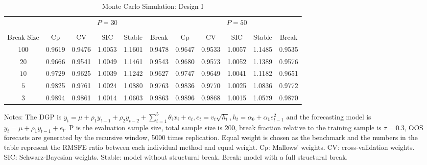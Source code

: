 \newpage
\begin{table}
    \caption{Monte Carlo Simulation: Design I} \label{ntb:1}
    \centering
    \begin{adjustbox}{width=\textwidth,totalheight=\textheight,keepaspectratio}
    \begin{threeparttable}
    \begin{tabular}{ccccccccccc}
    \toprule
     & \multicolumn{5}{c}{$P = 30$} & \multicolumn{5}{c}{$P = 50$} \\
    \cmidrule(r){2-6}
    \cmidrule(r){7-11} \\
      Break Size   & Cp     &   CV   & SIC    & Stable & Break  & Cp     & CV     & SIC    & Stable & Break \\
             $100$ & 0.9619 & 0.9476 & 1.0053 & 1.1601 & 0.9478 & 0.9647 & 0.9533 & 1.0057 & 1.1485 & 0.9535 \\
             $20$  & 0.9666 & 0.9541 & 1.0049 & 1.1461 & 0.9543 & 0.9680 & 0.9573 & 1.0052 & 1.1389 & 0.9576 \\
             $10$  & 0.9729 & 0.9625 & 1.0039 & 1.1242 & 0.9627 & 0.9747 & 0.9649 & 1.0041 & 1.1182 & 0.9651 \\
             $5$   & 0.9825 & 0.9761 & 1.0024 & 1.0880 & 0.9763 & 0.9836 & 0.9770 & 1.0025 & 1.0836 & 0.9772 \\
             $3$   & 0.9894 & 0.9861 & 1.0014 & 1.0603 & 0.9863 & 0.9896 & 0.9868 & 1.0015 & 1.0579 & 0.9870 \\
    \bottomrule
    \end{tabular}
    \begin{tablenotes} \footnotesize
    Notes: The DGP is $y_{t} = \mu + \rho_{1}y_{t-1} + \rho_{2}y_{t-2} + \sum_{i=1}^{5}\theta_{i}x_{i} + e_{t}, e_{t} = v_{t}\sqrt{h_{t}}, h_{t} = \alpha_{0} + \alpha_{1}e_{t-1}^2$ and the forecasting model is $y_{t} = \mu + \rho_{1}y_{t-1} + e_{t}$. $\mathrm{P}$ is the evaluation sample size, total sample size is $200$, break fraction relative to the training sample is $\tau = 0.3$, OOS forecasts are generated by the recursive window, 5000 times replication. Equal weight is chosen as the benchmark and the numbers in the table represent the RMSFE ratio between each individual method and equal weight. Cp: Mallows' weights. CV: cross-validation weights. SIC: Schwarz-Bayesian weights. Stable: model without structural break. Break: model with a full structural break.
    \end{tablenotes}
    \end{threeparttable}
    \end{adjustbox}
\end{table}